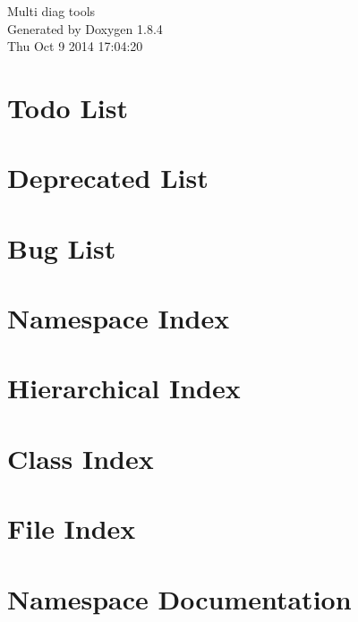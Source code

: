 \documentclass[twoside]{book}
\newcommand{\clearemptydoublepage}{%
  \newpage{\pagestyle{empty}\cleardoublepage}%
}
\begin{document}
\hypersetup{pageanchor=false}
\begin{titlepage}
\vspace*{7cm}
\begin{center}%
{\Large Multi diag tools }\\
\vspace*{1cm}
{\large Generated by Doxygen 1.8.4}\\
\vspace*{0.5cm}
{\small Thu Oct 9 2014 17:04:20}\\
\end{center}
\end{titlepage}
\clearemptydoublepage
\tableofcontents
\clearemptydoublepage
{}
\hypersetup{pageanchor=true}

\chapter{Todo List}
\label{todo}
\hypertarget{todo}{}

\chapter{Deprecated List}
\label{deprecated}
\hypertarget{deprecated}{}

\chapter{Bug List}
\label{bug}
\hypertarget{bug}{}

\chapter{Namespace Index}

\chapter{Hierarchical Index}

\chapter{Class Index}

\chapter{File Index}

\chapter{Namespace Documentation}




\end{document}
